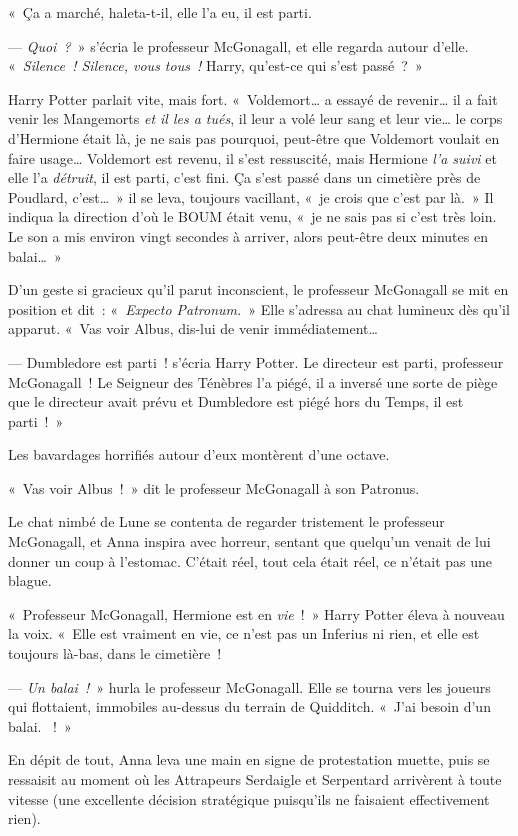 «~Ça a marché, haleta-t-il, elle l'a eu, il est parti.

--- \emph{Quoi~?}~» s'écria le professeur McGonagall, et elle regarda autour d'elle. «~\emph{Silence~! Silence, vous tous~!} Harry, qu'est-ce qui s'est passé~?~»

Harry Potter parlait vite, mais fort. «~Voldemort… a essayé de revenir… il a fait venir les Mangemorts \emph{et il les a tués}, il leur a volé leur sang et leur vie… le corps d'Hermione était là, je ne sais pas pourquoi, peut-être que Voldemort voulait en faire usage… Voldemort est revenu, il s'est ressuscité, mais Hermione \emph{l'a suivi} et elle l'a \emph{détruit}, il est parti, c'est fini. Ça s'est passé dans un cimetière près de Poudlard, c'est…~» il se leva, toujours vacillant, «~je crois que c'est par là.~» Il indiqua la direction d'où le BOUM était venu, «~je ne sais pas si c'est très loin. Le son a mis environ vingt secondes à arriver, alors peut-être deux minutes en balai…~»

D'un geste si gracieux qu'il parut inconscient, le professeur McGonagall se mit en position et dit~: «~\emph{Expecto Patronum.}~» Elle s'adressa au chat lumineux dès qu'il apparut. «~Vas voir Albus, dis-lui de venir immédiatement…

--- Dumbledore est parti~! s'écria Harry Potter. Le directeur est parti, professeur McGonagall~! Le Seigneur des Ténèbres l'a piégé, il a inversé une sorte de piège que le directeur avait prévu et Dumbledore est piégé hors du Temps, il est parti~!~»

Les bavardages horrifiés autour d'eux montèrent d'une octave.

«~Vas voir Albus~!~» dit le professeur McGonagall à son Patronus.

Le chat nimbé de Lune se contenta de regarder tristement le professeur McGonagall, et Anna inspira avec horreur, sentant que quelqu'un venait de lui donner un coup à l'estomac. C'était réel, tout cela était réel, ce n'était pas une blague.

«~Professeur McGonagall, Hermione est en \emph{vie}~!~» Harry Potter éleva à nouveau la voix. «~Elle est vraiment en vie, ce n'est pas un Inferius ni rien, et elle est toujours là-bas, dans le cimetière~!

--- \emph{Un balai~!}~» hurla le professeur McGonagall. Elle se tourna vers les joueurs qui flottaient, immobiles au-dessus du terrain de Quidditch. «~J'ai besoin d'un balai. ~!~»

En dépit de tout, Anna leva une main en signe de protestation muette, puis se ressaisit au moment où les Attrapeurs Serdaigle et Serpentard arrivèrent à toute vitesse (une excellente décision stratégique puisqu'ils ne faisaient effectivement rien).

